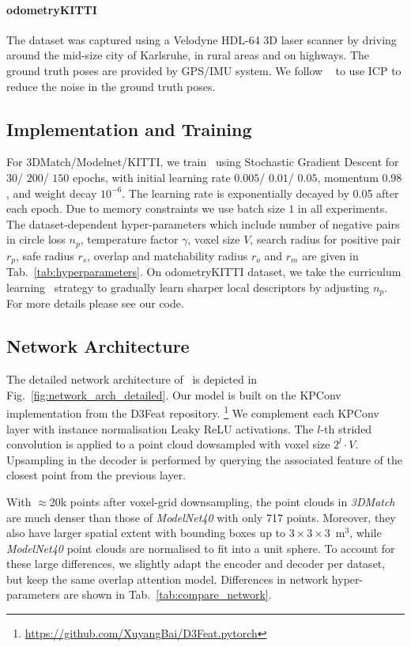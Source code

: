 \paragraph{odometryKITTI}
The dataset was captured using a Velodyne HDL-64 3D laser scanner by driving around the mid-size city of Karlsruhe, in rural areas and on highways. The ground truth poses are provided by GPS/IMU system. We follow ~\cite{bai2020d3feat} to use ICP to reduce the noise in the ground truth poses. 


\subsection{Implementation and Training}

\label{sec:training_supp}
For 3DMatch/Modelnet/KITTI, we train \acro\ using Stochastic Gradient Descent for $30$/ $200$/ $150$ epochs, with initial learning rate $0.005$/ $0.01$/ $0.05$, momentum $0.98$, and weight decay $10^{-6}$. The learning rate is exponentially decayed by 0.05 after each epoch. Due to memory constraints we use batch size $1$ in all experiments. The dataset-dependent hyper-parameters which include number of negative pairs in circle loss $n_p$, temperature factor $\gamma$, voxel size $V$, search radius for positive pair $r_p$, safe radius $r_s$, overlap and matchability radius $r_o$ and $r_m$ are given in Tab.~\ref{tab:hyperparameters}. On odometryKITTI dataset, we take the curriculum learning~\cite{bengio2009curriculum} strategy to gradually learn sharper local descriptors by adjusting $n_p$. For more details please see our code.

\subsection{Network Architecture}
\label{sec:network_arch_supp}

The detailed network architecture of \acro\ is depicted in Fig.~\ref{fig:network_arch_detailed}. Our model is built on the KPConv implementation from the D3Feat repository.%
\footnote{\url{https://github.com/XuyangBai/D3Feat.pytorch}} %
We complement each KPConv layer with instance normalisation Leaky ReLU activations. The $l$-th strided convolution is applied to a point cloud dowsampled with voxel size $2^{l}\cdot V$. Upsampling in the decoder is performed by querying the associated feature of the closest point from the previous layer.  

With $\approx$20k points after voxel-grid downsampling, the point clouds in \emph{3DMatch}  are much denser than those of \emph{ModelNet40} with only 717 points. Moreover, they also have larger spatial extent with bounding boxes up to $3\times3\times3$~$\text{m}^3$, while \emph{ModelNet40} point clouds are normalised to fit into a unit sphere.
To account for these large differences, we slightly adapt the encoder and decoder per dataset, but keep the same overlap attention model. Differences in network hyper-parameters are shown in Tab.~\ref{tab:compare_network}. 


